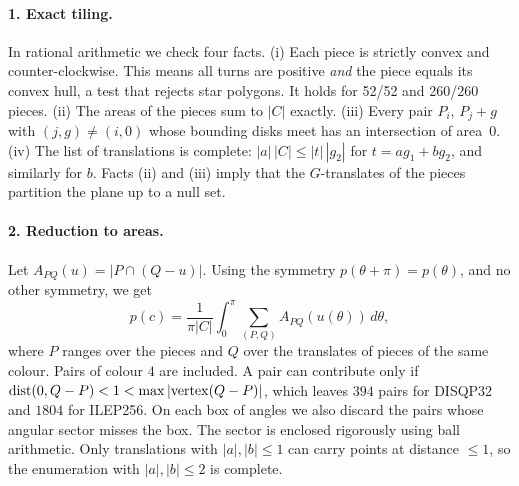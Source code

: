 \documentclass[10pt,a4paper]{article}
\begin{document}
\paragraph{1. Exact tiling.} In rational arithmetic we check four facts. (i) Each piece is strictly
convex and counter-clockwise. This means all turns are positive \emph{and} the piece equals its
convex hull, a test that rejects star polygons. It holds for 52/52 and 260/260 pieces. (ii) The areas
of the pieces sum to $|C|$ exactly. (iii) Every pair $P_i$, $P_j+g$ with $(j,g)\ne(i,0)$ whose
bounding disks meet has an intersection of area~$0$. (iv) The list of translations is complete:
$|a|\,|C|\le|t|\,|g_2|$ for $t=ag_1+bg_2$, and similarly for $b$. Facts (ii) and (iii) imply that
the $G$-translates of the pieces partition the plane up to a null set.

\paragraph{2. Reduction to areas.} Let $A_{PQ}(u)=|P\cap(Q-u)|$. Using the symmetry
$p(\theta+\pi)=p(\theta)$, and no other symmetry, we get
\[ p(c)=\frac{1}{\pi|C|}\int_0^\pi\sum_{(P,Q)}A_{PQ}(u(\theta))\,d\theta, \]
where $P$ ranges over the pieces and $Q$ over the translates of pieces of the same colour.
Pairs of colour $4$ are included. A pair can contribute only if $\operatorname{dist}(0,Q-P)<1<
\max|{\rm vertex}(Q-P)|$, which leaves $394$ pairs for DISQP32 and $1804$ for ILEP256. On each box
of angles we also discard the pairs whose angular sector misses the box. The sector is enclosed
rigorously using ball arithmetic. Only translations with $|a|,|b|\le1$ can carry points at
distance $\le1$, so the enumeration with $|a|,|b|\le2$ is complete.
\end{document}
